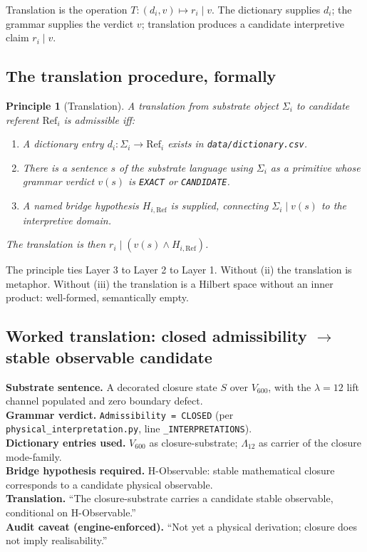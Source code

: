 \documentclass[11pt,a4paper]{article}
\newtheorem{principle}{Principle}
\newcommand{\Vsix}{V_{600}}
\newcommand{\Lambt}{\Lambda_{12}}
\begin{document}
Translation is the operation $T : (d_i, v) \mapsto r_i \mid v$.
The dictionary supplies $d_i$; the grammar supplies the verdict
$v$; translation produces a candidate interpretive claim
$r_i \mid v$.

\subsection{The translation procedure, formally}

\begin{principle}[Translation]
\label{prin:translation}
A translation from substrate object $\Sigma_i$ to candidate
referent $\mathrm{Ref}_i$ is admissible iff:

\begin{enumerate}[leftmargin=*,label=(\roman*)]
  \item A dictionary entry $d_i : \Sigma_i \to \mathrm{Ref}_i$
        exists in \texttt{data/dictionary.csv}.
  \item There is a sentence $s$ of the substrate language using
        $\Sigma_i$ as a primitive whose grammar verdict $v(s)$ is
        \texttt{EXACT} or \texttt{CANDIDATE}.
  \item A named bridge hypothesis $H_{i,\mathrm{Ref}}$ is supplied,
        connecting $\Sigma_i \mid v(s)$ to the interpretive
        domain.
\end{enumerate}

The translation is then $r_i \mid (v(s) \wedge H_{i,\mathrm{Ref}})$.
\end{principle}

The principle ties Layer 3 to Layer 2 to Layer 1. Without (ii) the
translation is metaphor. Without (iii) the translation is a Hilbert
space without an inner product: well-formed, semantically empty.

\subsection{Worked translation: closed admissibility $\to$ stable
observable candidate}

\begin{transbox}
\textbf{Substrate sentence.} A decorated closure state $S$ over
$\Vsix$, with the $\lambda = 12$ lift channel populated and zero
boundary defect.
\\
\textbf{Grammar verdict.} \texttt{Admissibility = CLOSED} (per
\texttt{physical\_interpretation.py}, line \texttt{\_INTERPRETATIONS}).
\\
\textbf{Dictionary entries used.} $\Vsix$ as
closure-substrate; $\Lambt$ as carrier of the closure mode-family.
\\
\textbf{Bridge hypothesis required.} H-Observable: stable
mathematical closure corresponds to a candidate physical
observable.
\\
\textbf{Translation.} ``The closure-substrate carries a candidate
stable observable, conditional on H-Observable.''
\\
\textbf{Audit caveat (engine-enforced).} ``Not yet a physical
derivation; closure does not imply realisability.''
\end{transbox}
\end{document}

